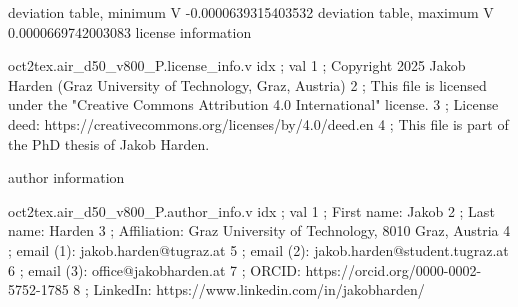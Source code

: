 \expandafter\def\csname oct2tex.air_d50_v800_P.dtabmin.d\endcsname{deviation table, minimum}
\expandafter\def\csname oct2tex.air_d50_v800_P.dtabmin.u\endcsname{\ensuremath{\text{V}}}
\expandafter\def\csname oct2tex.air_d50_v800_P.dtabmin.v\endcsname{-0.0000639315403532}
\expandafter\def\csname oct2tex.air_d50_v800_P.dtabmax.d\endcsname{deviation table, maximum}
\expandafter\def\csname oct2tex.air_d50_v800_P.dtabmax.u\endcsname{\ensuremath{\text{V}}}
\expandafter\def\csname oct2tex.air_d50_v800_P.dtabmax.v\endcsname{0.0000669742003083}
\expandafter\def\csname oct2tex.air_d50_v800_P.license_info.d\endcsname{license information}
\begin{filecontents}[overwrite]{oct2tex.air_d50_v800_P.license_info.v}
idx ; val
1 ; Copyright 2025 Jakob Harden (Graz University of Technology, Graz, Austria)
2 ; This file is licensed under the "Creative Commons Attribution 4.0 International" license.
3 ; License deed: https://creativecommons.org/licenses/by/4.0/deed.en
4 ; This file is part of the PhD thesis of Jakob Harden.
\end{filecontents}
\expandafter\def\csname oct2tex.air_d50_v800_P.author_info.d\endcsname{author information}
\begin{filecontents}[overwrite]{oct2tex.air_d50_v800_P.author_info.v}
idx ; val
1 ; First name: Jakob
2 ; Last name: Harden
3 ; Affiliation: Graz University of Technology, 8010 Graz, Austria
4 ; email (1): jakob.harden@tugraz.at
5 ; email (2): jakob.harden@student.tugraz.at
6 ; email (3): office@jakobharden.at
7 ; ORCID: https://orcid.org/0000-0002-5752-1785
8 ; LinkedIn: https://www.linkedin.com/in/jakobharden/
\end{filecontents}
